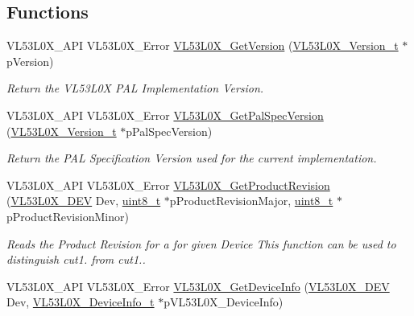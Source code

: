 \subsection*{Functions}
\begin{DoxyCompactItemize}
\item 
V\+L53\+L0\+X\+\_\+\+A\+PI V\+L53\+L0\+X\+\_\+\+Error \hyperlink{group__VL53L0X__general__group_gadb15b4f97b7218b3bdf571f90c27ec5e}{V\+L53\+L0\+X\+\_\+\+Get\+Version} (\hyperlink{structVL53L0X__Version__t}{V\+L53\+L0\+X\+\_\+\+Version\+\_\+t} $\ast$p\+Version)
\begin{DoxyCompactList}\small\item\em Return the V\+L53\+L0X P\+AL Implementation Version. \end{DoxyCompactList}\item 
V\+L53\+L0\+X\+\_\+\+A\+PI V\+L53\+L0\+X\+\_\+\+Error \hyperlink{group__VL53L0X__general__group_gad66c4309fbbf14d68692c18982158fba}{V\+L53\+L0\+X\+\_\+\+Get\+Pal\+Spec\+Version} (\hyperlink{structVL53L0X__Version__t}{V\+L53\+L0\+X\+\_\+\+Version\+\_\+t} $\ast$p\+Pal\+Spec\+Version)
\begin{DoxyCompactList}\small\item\em Return the P\+AL Specification Version used for the current implementation. \end{DoxyCompactList}\item 
V\+L53\+L0\+X\+\_\+\+A\+PI V\+L53\+L0\+X\+\_\+\+Error \hyperlink{group__VL53L0X__general__group_ga61bbb7db521494b59d82f0c0ee359260}{V\+L53\+L0\+X\+\_\+\+Get\+Product\+Revision} (\hyperlink{group__VL53L0X__platform__group_ga2d6405308b1dd524b462f1b8fb97d167}{V\+L53\+L0\+X\+\_\+\+D\+EV} Dev, \hyperlink{vl53l0x__types_8h_aba7bc1797add20fe3efdf37ced1182c5}{uint8\+\_\+t} $\ast$p\+Product\+Revision\+Major, \hyperlink{vl53l0x__types_8h_aba7bc1797add20fe3efdf37ced1182c5}{uint8\+\_\+t} $\ast$p\+Product\+Revision\+Minor)
\begin{DoxyCompactList}\small\item\em Reads the Product Revision for a for given Device This function can be used to distinguish cut1. from cut1.. \end{DoxyCompactList}\item 
V\+L53\+L0\+X\+\_\+\+A\+PI V\+L53\+L0\+X\+\_\+\+Error \hyperlink{group__VL53L0X__general__group_ga608dd0345885215992789821cb094e17}{V\+L53\+L0\+X\+\_\+\+Get\+Device\+Info} (\hyperlink{group__VL53L0X__platform__group_ga2d6405308b1dd524b462f1b8fb97d167}{V\+L53\+L0\+X\+\_\+\+D\+EV} Dev, \hyperlink{structVL53L0X__DeviceInfo__t}{V\+L53\+L0\+X\+\_\+\+Device\+Info\+\_\+t} $\ast$p\+V\+L53\+L0\+X\+\_\+\+Device\+Info)

\end{DoxyCompactItemize}
